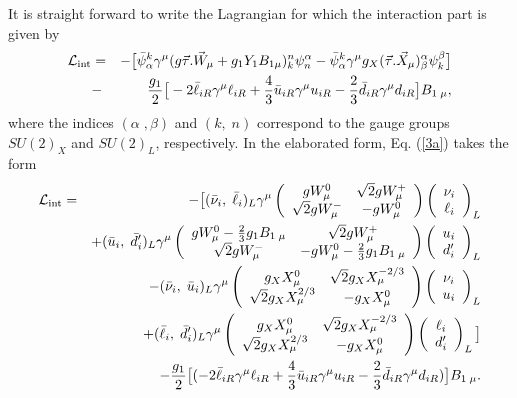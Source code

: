 \documentclass{ws-ijmpa}
\begin{document}
It is straight forward to write the Lagrangian for which the interaction
part is given by
\begin{eqnarray}
\mathcal{L}_{\text{int}}&=& -\big[\bar{\psi}_{\alpha}^{k}\gamma^{\mu}(g\vec{\tau}.\vec{W}_{\mu}+g_{1}Y_{1}B_{1\mu})_{k}^{n}\psi_{n}^{\alpha} -\bar{\psi}_{\alpha}^{k}\gamma^{\mu}g_{X}(\vec{\tau}.\vec{X}_{\mu})_{\beta}^{\alpha}\psi_{k}^{\beta}\big]\notag\\
&-&\frac{g_{1}}{2}\big[-2\bar{\ell}_{iR}\gamma^{\mu}\ell_{iR}+\frac{4}{3}\bar{u}_{iR}\gamma^{\mu}u_{iR}-\frac{2}{3}\bar{d}_{iR}\gamma^{\mu}d_{iR}\big]B_{1\; \mu} ,\label{3a}
\end{eqnarray}
where the indices $(\alpha\;, \beta)$ and $(k,\; n)$ correspond to the gauge groups $SU(2)_X$ and $SU(2)_L$, respectively. In the elaborated form, Eq. (\ref{3a}) takes the form
\begin{eqnarray}
\mathcal{L}_{\text{int}}&=&-\big[(\bar{\nu}_i,\; \bar{\ell}_{i})_{L}\gamma^{\mu}\left(\begin{array}{cc} gW^{0}_{\mu}& \sqrt{2}g W^{+}_{\mu}\\
\sqrt{2}g W^{-}_{\mu} & -gW^{0}_{\mu}\end{array}\right)\left(\begin{array}{c} \nu_i \\ \ell_i\end{array}\right)_L\notag\\
&&+ (\bar{u}_i,\; \bar{d}^{\prime}_{i})_{L}\gamma^{\mu}\left(\begin{array}{cc} gW^{0}_{\mu}-\frac{2}{3}g_1B_{1\; \mu}& \sqrt{2}g W^{+}_{\mu}\\
\sqrt{2}g W^{-}_{\mu} & -gW^{0}_{\mu}-\frac{2}{3}g_1B_{1\; \mu}\end{array}\right)\left(\begin{array}{c} u_i \\ d^{\prime}_i\end{array}\right)_L\notag \\
&&-(\bar{\nu}_i,\; \bar{u}_{i})_{L}\gamma^{\mu}\left(\begin{array}{cc} g_{X}X^{0}_{\mu}& \sqrt{2}g_{X} X^{-2/3}_{\mu}\\
\sqrt{2}g_{X} X^{2/3}_{\mu} & -g_{X}X^{0}_{\mu}\end{array}\right)\left(\begin{array}{c} \nu_i \\ u_i\end{array}\right)_L \notag\\
&&+ (\bar{\ell}_i,\; \bar{d}^{\prime}_{i})_{L}\gamma^{\mu}\left(\begin{array}{cc} g_{X}X^{0}_{\mu}& \sqrt{2}g_{X} X^{-2/3}_{\mu}\\
\sqrt{2}g_{X} X^{2/3}_{\mu} & -g_{X}X^{0}_{\mu}\end{array}\right)\left(\begin{array}{c} \ell_i \\ d^{\prime}_{i}\end{array}\right)_L\big]\notag \\
&&-\frac{g_1}{2}\big[(-2\bar{\ell}_{i R}\gamma^{\mu}\ell_{i R}+\frac{4}{3}\bar{u}_{i R}\gamma^{\mu}u_{i R}-\frac{2}{3}\bar{d}_{i R}\gamma^{\mu}d_{i R})\big]B_{1\; \mu}.\label{3}
\end{eqnarray}
\end{document}
